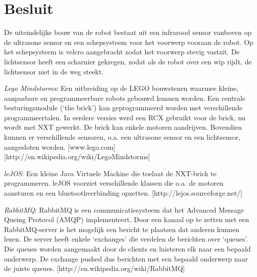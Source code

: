 \documentclass[tt1]{penoverslag}
\begin{document}
\section{Besluit}
De uiteindelijke bouw van de robot bestaat uit een infrarood sensor vanboven op de ultrasone sensor en een schepsysteem voor het voorwerp vooraan de robot. Op het schepsysteem is velcro aangebracht zodat het voorwerp stevig vastzit. De lichtsensor heeft een scharnier gekregen, zodat als de robot over een wip rijdt, de lichtsensor niet in de weg steekt. 





\newpage



\begin{thebibliography}{9}
\textit{Lego Mindstorms}:  Een uitbreiding op de LEGO bouwstenen waarmee kleine, aanpasbare en programmeerbare robots gebouwd kunnen worden. Een centrale besturingsmodule (`the brick') kan geprogrammeerd worden met verschillende programmeertalen. In eerdere versies werd een RCX gebruikt voor de brick, nu wordt met NXT gewerkt. De brick kan enkele motoren aandrijven. Bovendien kunnen er verschillende sensoren, o.a. een ultrasone sensor en een lichtsensor, aangesloten worden.  \mbox{[www.lego.com]} \mbox{[http://en.wikipedia.org/wiki/Lego\textendash Mindstorms]}

\textit{leJOS}: Een kleine Java Virtuele Machine die toelaat de NXT-brick te programmeren. leJOS voorziet verschillende klassen die o.a. de motoren aansturen en een bluetoothverbinding opzetten.  \mbox{[http://lejos.sourceforge.net/]}

\textit{RabbitMQ}: RabbitMQ is een communicatiesysteem dat het Advanced Message Queing Protocol (AMQP) implementeert. Door een kanaal op te zetten met een RabbitMQ-server is het mogelijk een bericht te plaatsen dat anderen kunnen lezen. De server heeft enkele `exchanges' die verdelen de berichten over `queues'. Die queues worden aangemaakt door de clients en luisteren elk naar een bepaald onderwerp. De exchange pushed dus berichten met een bepaald onderwerp naar de juiste queues.
\mbox{[http://en.wikipedia.org/wiki/RabbitMQ]}


\end{thebibliography}
\end{document}

